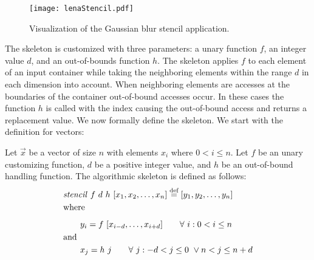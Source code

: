 \begin{figure}
  \centering
  \texttt{[image: lenaStencil.pdf]}
  \caption{Visualization of the Gaussian blur stencil application.}
  \label{fig:stencilExample}
\end{figure}

The \stencil skeleton is customized with three parameters: a unary function $f$, an integer value $d$, and an out-of-bounds function $h$.
The skeleton applies $f$ to each element of an input container while taking the neighboring elements within the range $d$ in each dimension into account.
When neighboring elements are accesses at the boundaries of the container out-of-bound accesses occur.
In these cases the function $h$ is called with the index causing the out-of-bound access and returns a replacement value.
We now formally define the \stencil skeleton. We start with the definition for vectors:
\begin{definition}
  \label{definition:mapoverlap}
  Let $\vec{x}$ be a vector of size $n$ with elements $x_i$ where $0 < i \leq n$.
  Let $f$ be an unary customizing function, $d$ be a positive integer value, and $h$ be an out-of-bound handling function.
  The algorithmic skeleton \stencil is defined as follows:
  \begin{equation*}
    \begin{split}
    &\stencil\ f\  d\ h\ [x_1, x_2, \ldots, x_n] \eqdef [y_1, y_2, \dots, y_n]\\
    &\text{where}\\[.5em]
    &\qquad y_i = f\ [x_{i-d}, \ldots, x_{i+d}] \qquad \forall\ i :  0 < i \leq n\\
    &\text{and\hfill}\\
    &\qquad x_j = h\ j \qquad \forall\ j : -d < j \leq 0\ \vee n < j \leq n+d
    \end{split}
  \end{equation*}
\end{definition}

